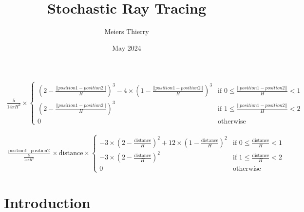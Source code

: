 \documentclass[a4paper, 12pt, onepage]{report}
\title{Stochastic Ray Tracing}
\author{Meiers Thierry}
\date{May 2024}
\begin{document}
\makeTitleAndTable

\begin{align*}
    \frac{5}{14\pi H^2} \times
    \begin{cases}
    (2 - \frac{||position1 - position2||}{H})^3 - 4 \times (1 - \frac{||position1 - position2||}{H})^3 & \text{if } 0 \leq \frac{||position1 - position2||}{H} < 1 \\
    (2 - \frac{||position1 - position2||}{H})^3 & \text{if } 1 \leq \frac{||position1 - position2||}{H} < 2 \\
    0 & \text{otherwise}
    \end{cases}
\end{align*}

\begin{align*}
    \frac{\text{position1} - \text{position2}}{\frac{5}{14\pi H^3}} \times \text{distance} \times
    \begin{cases}
    -3 \times (2 - \frac{\text{distance}}{H})^2 + 12 \times (1 - \frac{\text{distance}}{H})^2 & \text{if } 0 \leq \frac{\text{distance}}{H} < 1 \\
    -3 \times (2 - \frac{\text{distance}}{H})^2 & \text{if } 1 \leq \frac{\text{distance}}{H} < 2 \\
    0 & \text{otherwise}
    \end{cases}
\end{align*}

\section{Introduction}
\end{document}
